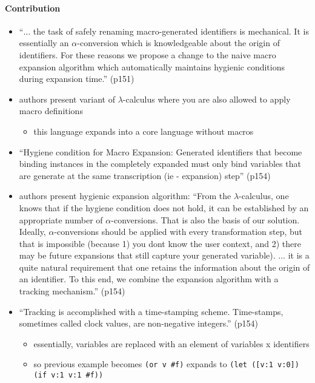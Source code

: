 \documentclass[12pt]{article}	%
\begin{document}
\paragraph{Contribution}

\begin{itemize}
		
	\item ``$\ldots$ the task of safely renaming macro-generated identifiers is mechanical. It is essentially an $\alpha$-conversion which is knowledgeable about the origin of identifiers. For these reasons we propose a change to the naive macro expansion algorithm which automatically maintains hygienic conditions during expansion time.'' (p151)
	
	\item authors present variant of $\lambda$-calculus where you are also allowed to apply macro definitions
		\begin{itemize}
			\item this language expands into a core language without macros
		\end{itemize}
		
	\item ``Hygiene condition for Macro Expansion: Generated identifiers that become binding instances in the completely expanded must only bind variables that are generate at the same transcription (ie - expansion) step'' (p154)
	
	\item authors present hygienic expansion algorithm: ``From the $\lambda$-calculus, one knows that if the hygiene condition does not hold, it can be established by an appropriate number of $\alpha$-conversions. That is also the basis of our solution. Ideally, $\alpha$-conversions should be applied with every transformation step, but that is impossible (because 1) you dont know the user context, and 2) there may be future expansions that still capture your generated variable). $\ldots$ it is a quite natural requirement that one retains the information about the origin of an identifier. To this end, we combine the expansion algorithm with a tracking mechanism.'' (p154)
	
	\item ``Tracking is accomplished with a time-stamping scheme. Time-stamps, sometimes called clock values, are non-negative integers.'' (p154)
		\begin{itemize}
			\item essentially, variables are replaced with an element of variables x identifiers
			\item so previous example becomes \verb!(or v #f)! expands to \verb!(let ([v:1 v:0]) (if v:1 v:1 #f))!
		\end{itemize}
		

\end{itemize}
\end{document}
